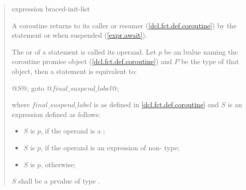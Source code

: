 \begin{quote}

\begin{bnf}
	\br
	 expression\opt \terminal{;}\br
	 braced-init-list\terminal{;}
\end{bnf}

\pnum
A coroutine returns to its caller or resumer (\ref{dcl.fct.def.coroutine}) by the  statement
or when suspended (\ref{expr.await}). 

\pnum
The  or  of a  statement is called its operand.
Let $p$ be an lvalue naming the coroutine promise object (\ref{dcl.fct.def.coroutine}) and $P$ be the type of that object, 
then a  statement is equivalent to:

 

\begin{codeblock}
  { @$S$@; goto @$final{\_}suspend{
      \_}label$@; }
\end{codeblock}

where $final{\_}suspend{\_}label$ is as defined in \ref{dcl.fct.def.coroutine} and $S$ is an expression defined as follows:

\begin{itemize}
  \item $S$ is  $p$\tcode{)}, if the operand is a ;
  \item $S$ is  $p$\tcode{)}, if the operand is an expression of non- type;
  \item $S$ is $p$, otherwise;
\end{itemize}
$S$ shall be a prvalue of type .


\end{quote}
